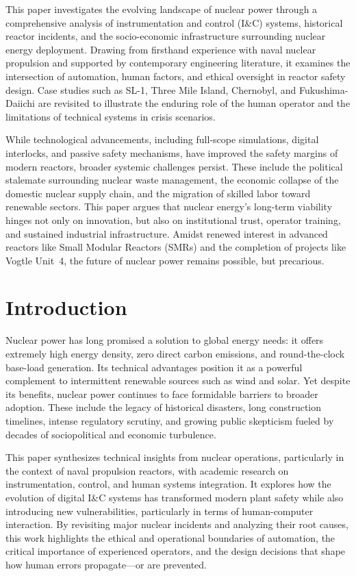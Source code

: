 \documentclass[12pt]{article}
\begin{document}
This paper investigates the evolving landscape of nuclear power through a comprehensive analysis of instrumentation and control (I\&C) systems, historical reactor incidents, and the socio-economic infrastructure surrounding nuclear energy deployment. Drawing from firsthand experience with naval nuclear propulsion and supported by contemporary engineering literature, it examines the intersection of automation, human factors, and ethical oversight in reactor safety design. Case studies such as SL-1, Three Mile Island, Chernobyl, and Fukushima-Daiichi are revisited to illustrate the enduring role of the human operator and the limitations of technical systems in crisis scenarios.

While technological advancements, including full-scope simulations, digital interlocks, and passive safety mechanisms, have improved the safety margins of modern reactors, broader systemic challenges persist. These include the political stalemate surrounding nuclear waste management, the economic collapse of the domestic nuclear supply chain, and the migration of skilled labor toward renewable sectors. This paper argues that nuclear energy's long-term viability hinges not only on innovation, but also on institutional trust, operator training, and sustained industrial infrastructure. Amidst renewed interest in advanced reactors like Small Modular Reactors (SMRs) and the completion of projects like Vogtle Unit~4, the future of nuclear power remains possible, but precarious.

\newpage

\section{Introduction}

Nuclear power has long promised a solution to global energy needs: it offers extremely high energy density, zero direct carbon emissions, and round-the-clock base-load generation. Its technical advantages position it as a powerful complement to intermittent renewable sources such as wind and solar. Yet despite its benefits, nuclear power continues to face formidable barriers to broader adoption. These include the legacy of historical disasters, long construction timelines, intense regulatory scrutiny, and growing public skepticism fueled by decades of sociopolitical and economic turbulence.

This paper synthesizes technical insights from nuclear operations, particularly in the context of naval propulsion reactors, with academic research on instrumentation, control, and human systems integration. It explores how the evolution of digital I\&C systems has transformed modern plant safety while also introducing new vulnerabilities, particularly in terms of human-computer interaction. By revisiting major nuclear incidents and analyzing their root causes, this work highlights the ethical and operational boundaries of automation, the critical importance of experienced operators, and the design decisions that shape how human errors propagate—or are prevented.
\end{document}
